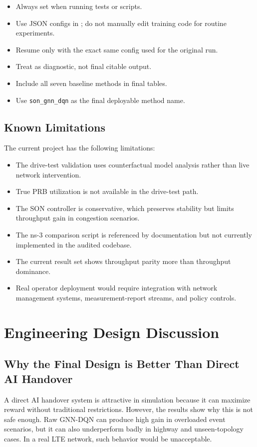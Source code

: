\documentclass[12pt,a4paper]{report}
\newcommand{\method}{\texttt{son\_gnn\_dqn}}
\begin{document}
\begin{itemize}
    \item Always set  when running tests or scripts.
    \item Use JSON configs in ; do not manually edit training code for routine experiments.
    \item Resume only with the exact same config used for the original run.
    \item Treat  as diagnostic, not final citable output.
    \item Include all seven baseline methods in final tables.
    \item Use \method{} as the final deployable method name.
\end{itemize}

\section{Known Limitations}
The current project has the following limitations:

\begin{itemize}
    \item The drive-test validation uses counterfactual model analysis rather than live network intervention.
    \item True PRB utilization is not available in the drive-test path.
    \item The SON controller is conservative, which preserves stability but limits throughput gain in congestion scenarios.
    \item The ns-3 comparison script is referenced by documentation but not currently implemented in the audited codebase.
    \item The current result set shows throughput parity more than throughput dominance.
    \item Real operator deployment would require integration with network management systems, measurement-report streams, and policy controls.
\end{itemize}

\chapter{Engineering Design Discussion}

\section{Why the Final Design is Better Than Direct AI Handover}
A direct AI handover system is attractive in simulation because it can maximize reward without traditional restrictions. However, the results show why this is not safe enough. Raw GNN-DQN can produce high gain in overloaded event scenarios, but it can also underperform badly in highway and unseen-topology cases. In a real LTE network, such behavior would be unacceptable.
\end{document}
